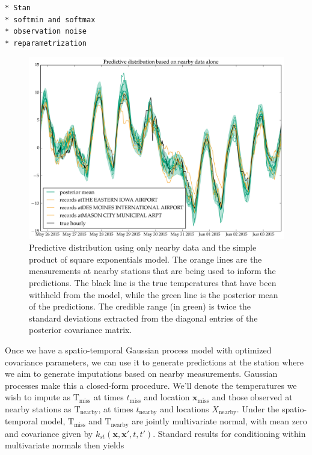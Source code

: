 \documentclass[letter]{article}
\makeatletter
\def\maxwidth{\ifdim\Gin@nat@width>\linewidth\linewidth
\else\Gin@nat@width\fi}
\let\Oldincludegraphics\includegraphics
\renewcommand{\includegraphics}[1]{\Oldincludegraphics[width=.8\maxwidth]{#1}}
\newcommand{\T}{\mathrm{T}}
\newcommand{\xvec}{\mathbold{x}}
\newcommand{\miss}{\mathrm{miss}}
\newcommand{\obs}{\mathrm{nearby}}
\makeatother
\begin{document}
\begin{verbatim}
* Stan
* softmin and softmax
* observation noise
* reparametrization
\end{verbatim}

\begin{figure}
\centering
\includegraphics{figures/predictive_nearby_SEonly.png}
\caption{Predictive distribution using only nearby data and the simple
product of square exponentials model. The orange lines are the
measurements at nearby stations that are being used to inform the
predictions. The black line is the true temperatures that have been
withheld from the model, while the green line is the posterior mean of
the predictions. The credible range (in green) is twice the standard
deviations extracted from the diagonal entries of the posterior
covariance matrix.}
\end{figure}

Once we have a spatio-temporal Gaussian process model with optimized
covariance parameters, we can use it to generate predictions at the
station where we aim to generate imputations based on nearby
measurements. Gaussian processes make this a closed-form procedure.
We'll denote the temperatures we wish to impute as \(\T_\miss{}\) at
times \(t_\miss\) and location \(\xvec_\miss\) and those observed at
nearby stations as \(\T_\obs{}\), at times \(t_\obs\) and locations
\(X_\obs\). Under the spatio-temporal model, \(\T_\miss\) and
\(\T_\obs\) are jointly multivariate normal, with mean zero and
covariance given by \(k_{st}(\xvec,\xvec',t,t')\). Standard results for
conditioning within multivariate normals then yields
\end{document}
